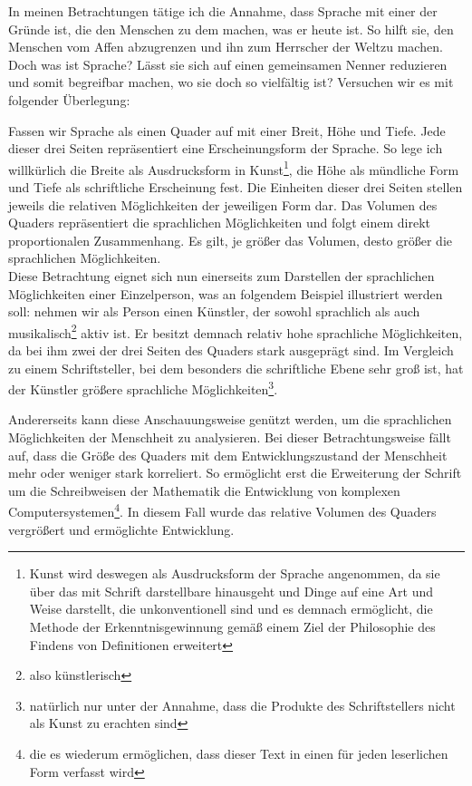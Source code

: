 \documentclass[12pt,a4paper,oneside]{article}
\begin{document}
  In meinen Betrachtungen tätige ich die Annahme, dass Sprache mit einer der Gründe ist, die den Menschen zu dem machen, was er heute ist. So hilft sie, den Menschen vom Affen abzugrenzen und ihn zum \glqq Herrscher der Welt\grqq zu machen. Doch was ist Sprache? Lässt sie sich auf einen gemeinsamen Nenner reduzieren und somit begreifbar machen, wo sie doch so vielfältig ist? Versuchen wir es mit folgender Überlegung:
  
  Fassen wir Sprache als einen Quader auf mit einer Breit, Höhe und Tiefe. Jede dieser drei Seiten repräsentiert eine Erscheinungsform der Sprache. So lege ich willkürlich die Breite als Ausdrucksform in Kunst\footnote{Kunst wird deswegen als Ausdrucksform der Sprache angenommen, da sie über das mit Schrift darstellbare hinausgeht und Dinge auf eine Art und Weise darstellt, die unkonventionell sind und es demnach ermöglicht, die Methode der Erkenntnisgewinnung gemäß einem Ziel der Philosophie des Findens von Definitionen erweitert}, die Höhe als mündliche Form und Tiefe als schriftliche Erscheinung fest. Die Einheiten dieser drei Seiten stellen jeweils die relativen Möglichkeiten der jeweiligen Form dar. Das Volumen des Quaders repräsentiert die sprachlichen Möglichkeiten und folgt einem direkt proportionalen Zusammenhang. Es gilt, je größer das Volumen, desto größer die sprachlichen Möglichkeiten. \\
  
  Diese Betrachtung eignet sich nun einerseits zum Darstellen der sprachlichen Möglichkeiten einer Einzelperson, was an folgendem Beispiel illustriert werden soll: nehmen wir als Person einen Künstler, der sowohl sprachlich als auch musikalisch\footnote{also künstlerisch} aktiv ist. Er besitzt demnach relativ hohe sprachliche Möglichkeiten, da bei ihm zwei der drei Seiten des Quaders stark ausgeprägt sind. Im Vergleich zu einem Schriftsteller, bei dem besonders die schriftliche Ebene sehr groß ist, hat der Künstler größere sprachliche Möglichkeiten\footnote{natürlich nur unter der Annahme, dass die Produkte des Schriftstellers nicht als Kunst zu erachten sind}.
  
  Andererseits kann diese Anschauungsweise genützt werden, um die sprachlichen Möglichkeiten der Menschheit zu analysieren. Bei dieser Betrachtungsweise fällt auf, dass die Größe des Quaders mit dem Entwicklungszustand der Menschheit mehr oder weniger stark korreliert. So ermöglicht erst die Erweiterung der Schrift um die Schreibweisen der Mathematik die Entwicklung von komplexen Computersystemen\footnote{die es wiederum ermöglichen, dass dieser Text in einen für jeden leserlichen Form verfasst wird}. In diesem Fall wurde das relative Volumen des Quaders vergrößert und ermöglichte Entwicklung.\\
  
\end{document}

